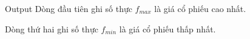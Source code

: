 Output
Dòng đầu tiên ghi số thực $f_{max}$ là giá cổ phiếu cao nhất.

Dòng thứ hai ghi số thực $f_{min}$ là giá cổ phiếu thấp nhất.